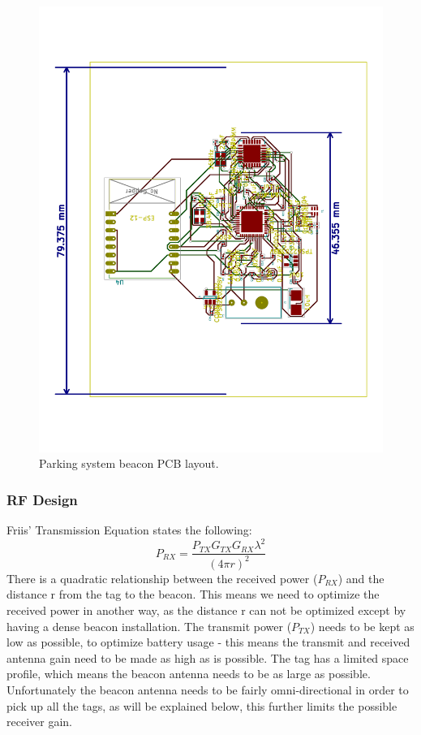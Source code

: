\begin{figure}[H]
\begin{center}
\includegraphics[scale=0.4,trim={1cm 1cm 1cm 1cm},clip,angle=-90]{data/pcb-layout-ESP.pdf}
\caption{Parking system beacon PCB layout.}
\end{center}
\end{figure}



\newpage
\subsubsection{RF Design}



Friis' Transmission Equation states the following:
$$P_{RX} = \frac{P_{TX}G_{TX}G_{RX} \lambda^2}{(4 \pi r)^2}$$
There is a quadratic relationship between the received power ($P_{RX}$) and the distance r from the tag to the beacon. This means we need to optimize the received power in another way, as the distance r can not be optimized except by having a dense beacon installation. The transmit power ($P_{TX}$) needs to be kept as low as possible, to optimize battery usage - this means the transmit and received antenna gain need to be made as high as is possible. The tag has a limited space profile, which means the beacon antenna needs to be as large as possible. Unfortunately the beacon antenna needs to be fairly omni-directional in order to pick up all the tags, as will be explained below, this further limits the possible receiver gain.

